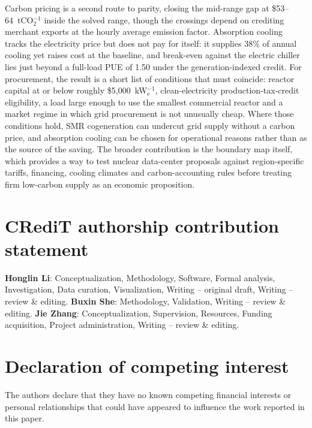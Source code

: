 \documentclass[a4paper,fleqn]{cas-sc}
\begin{document}
Carbon pricing is a second route to parity, closing the mid-range gap at \$53--64~tCO$_2^{-1}$ inside the solved range, though the crossings depend on crediting merchant exports at the hourly average emission factor. Absorption cooling tracks the electricity price but does not pay for itself: it supplies 38\% of annual cooling yet raises cost at the baseline, and break-even against the electric chiller lies just beyond a full-load PUE of 1.50 under the generation-indexed credit. For procurement, the result is a short list of conditions that must coincide: reactor capital at or below roughly \$5{,}000~kW$_\mathrm{e}^{-1}$, clean-electricity production-tax-credit eligibility, a load large enough to use the smallest commercial reactor and a market regime in which grid procurement is not unusually cheap. Where those conditions hold, SMR cogeneration can undercut grid supply without a carbon price, and absorption cooling can be chosen for operational reasons rather than as the source of the saving. The broader contribution is the boundary map itself, which provides a way to test nuclear data-center proposals against region-specific tariffs, financing, cooling climates and carbon-accounting rules before treating firm low-carbon supply as an economic proposition.


\section*{CRediT authorship contribution statement}
\textbf{Honglin Li}: Conceptualization, Methodology, Software, Formal analysis, Investigation, Data curation, Visualization, Writing -- original draft, Writing -- review \& editing. \textbf{Buxin She}: Methodology, Validation, Writing -- review \& editing. \textbf{Jie Zhang}: Conceptualization, Supervision, Resources, Funding acquisition, Project administration, Writing -- review \& editing.


\section*{Declaration of competing interest}
The authors declare that they have no known competing financial interests or personal relationships that could have appeared to influence the work reported in this paper.
\end{document}
